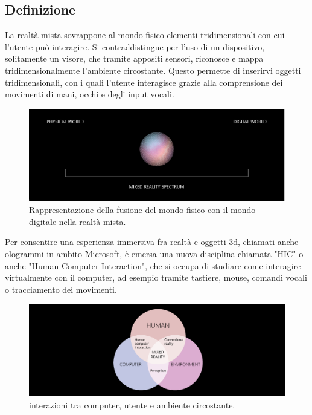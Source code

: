 \subsection{Definizione}
La realtà mista sovrappone al mondo fisico elementi tridimensionali con cui l'utente può interagire. Si contraddistingue per l'uso di un dispositivo, solitamente un visore, che tramite appositi sensori, riconosce e mappa tridimensionalmente l'ambiente circostante. Questo permette di inserirvi oggetti tridimensionali, con i quali l'utente interagisce grazie alla comprensione dei movimenti di mani, occhi e degli input vocali.
\begin{figure}[H]
    \includegraphics[scale=0.4]{figures/chapter_1/mixedrealityspectrum-worlds.png}
    \caption{Rappresentazione della fusione del mondo fisico con il mondo digitale nella realtà mista.}
    \centering
\end{figure}

Per consentire una esperienza immersiva fra realtà e oggetti 3d, chiamati anche ologrammi in ambito Microsoft, è emersa una nuova disciplina chiamata "HIC" o anche "Human-Computer Interaction", che si occupa di studiare come interagire virtualmente con il computer, ad esempio tramite tastiere, mouse, comandi vocali o tracciamento dei movimenti. \cite{MixedRealityDefinition}

\begin{figure}[H]
    \includegraphics[scale=0.4]{figures/chapter_1/mixed-reality-venn-diagram.png}
    \caption{interazioni tra computer, utente e ambiente circostante.}
    \centering
\end{figure}
    
